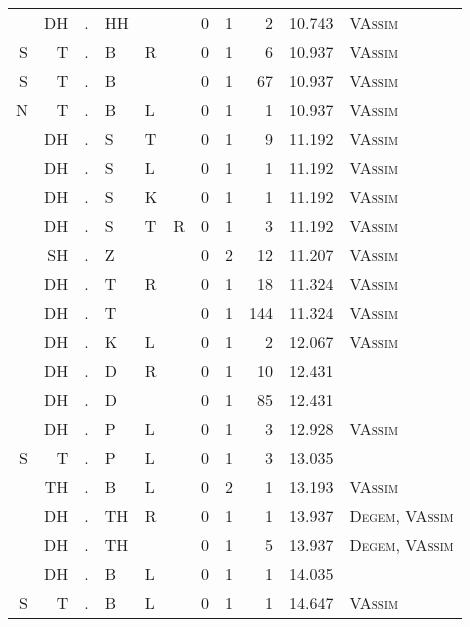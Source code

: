 \begin{longtable}{r@{ } r@{ } c@{ } l@{ } l@{ } l@{ } r r r r l }
  & DH & . & HH &   &   & 0 & 1 & 2 & 10.743 & \textsc{VAssim} \\
S & T & . & B & R &   & 0 & 1 & 6 & 10.937 & \textsc{VAssim} \\
S & T & . & B &   &   & 0 & 1 & 67 & 10.937 & \textsc{VAssim} \\
N & T & . & B & L &   & 0 & 1 & 1 & 10.937 & \textsc{VAssim} \\
  & DH & . & S & T &   & 0 & 1 & 9 & 11.192 & \textsc{VAssim} \\
  & DH & . & S & L &   & 0 & 1 & 1 & 11.192 & \textsc{VAssim} \\
  & DH & . & S & K &   & 0 & 1 & 1 & 11.192 & \textsc{VAssim} \\
  & DH & . & S & T & R & 0 & 1 & 3 & 11.192 & \textsc{VAssim} \\
  & SH & . & Z &   &   & 0 & 2 & 12 & 11.207 & \textsc{VAssim} \\
  & DH & . & T & R &   & 0 & 1 & 18 & 11.324 & \textsc{VAssim} \\
  & DH & . & T &   &   & 0 & 1 & 144 & 11.324 & \textsc{VAssim} \\
  & DH & . & K & L &   & 0 & 1 & 2 & 12.067 & \textsc{VAssim} \\
  & DH & . & D & R &   & 0 & 1 & 10 & 12.431 &  \\
  & DH & . & D &   &   & 0 & 1 & 85 & 12.431 &  \\
  & DH & . & P & L &   & 0 & 1 & 3 & 12.928 & \textsc{VAssim} \\
S & T & . & P & L &   & 0 & 1 & 3 & 13.035 &  \\
  & TH & . & B & L &   & 0 & 2 & 1 & 13.193 & \textsc{VAssim} \\
  & DH & . & TH & R &   & 0 & 1 & 1 & 13.937 & \textsc{Degem}, \textsc{VAssim} \\
  & DH & . & TH &   &   & 0 & 1 & 5 & 13.937 & \textsc{Degem}, \textsc{VAssim} \\
  & DH & . & B & L &   & 0 & 1 & 1 & 14.035 &  \\
S & T & . & B & L &   & 0 & 1 & 1 & 14.647 & \textsc{VAssim} \\
\bottomrule
\end{longtable}
